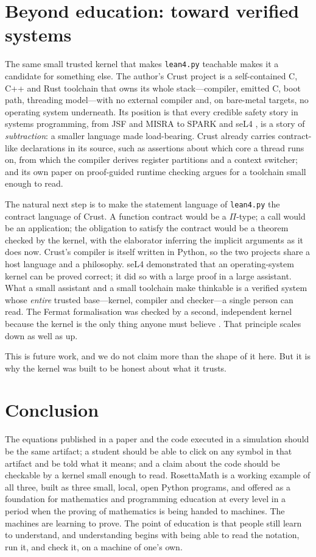 \documentclass[11pt]{article}
\begin{document}
\section{Beyond education: toward verified systems}
\label{sec:beyond}

The same small trusted kernel that makes \texttt{lean4.py} teachable makes it
a candidate for something else. The author's Crust project \cite{crust} is a
self-contained C, C++ and Rust toolchain that owns its whole stack---compiler,
emitted C, boot path, threading model---with no external compiler and, on
bare-metal targets, no operating system underneath. Its position is that every
credible safety story in systems programming, from JSF and MISRA to SPARK and
seL4 \cite{klein2009}, is a story of \emph{subtraction}: a smaller language made
load-bearing. Crust already carries contract-like declarations in its source,
such as assertions about which core a thread runs on, from which the compiler
derives register partitions and a context switcher; and its own paper on
proof-guided runtime checking \cite{crustsafety} argues for a toolchain small
enough to read.

The natural next step is to make the statement language of \texttt{lean4.py}
the contract language of Crust. A function contract would be a $\Pi$-type; a
call would be an application; the obligation to satisfy the contract would be
a theorem checked by the kernel, with the elaborator inferring the implicit
arguments as it does now. Crust's compiler is itself written in Python, so the
two projects share a host language and a philosophy. seL4 demonstrated that an
operating-system kernel can be proved correct; it did so with a large proof in
a large assistant. What a small assistant and a small toolchain make thinkable
is a verified system whose \emph{entire} trusted base---kernel, compiler and
checker---a single person can read. The Fermat formalisation was checked by a
second, independent kernel because the kernel is the only thing anyone must
believe \cite{anthropic2026flt}. That principle scales down as well as up.

This is future work, and we do not claim more than the shape of it here. But it
is why the kernel was built to be honest about what it trusts.

\section{Conclusion}

The equations published in a paper and the code executed in a simulation should
be the same artifact; a student should be able to click on any symbol in that
artifact and be told what it means; and a claim about the code should be
checkable by a kernel small enough to read. RosettaMath is a working example of
all three, built as three small, local, open Python programs, and offered as a
foundation for mathematics and programming education at every level in a
period when the proving of mathematics is being handed to machines. The
machines are learning to prove. The point of education is that people still
learn to understand, and understanding begins with being able to read the
notation, run it, and check it, on a machine of one's own.
\end{document}
